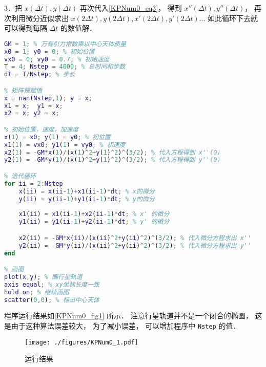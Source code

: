 3．把 $x(\Delta t), y(\Delta t)$ 再次代入\autoref{KPNum0_eq3}， 得到 $x''(\Delta t), y''(\Delta t)$， 再次利用微分近似求出 $x(2\Delta t), y(2\Delta t), x'(2\Delta t), y'(2\Delta t) \dots$ 如此循环下去就可以得到每隔 $\Delta t$ 的数值解．

\begin{lstlisting}[language=matlab, caption=kepler.m]
% 参数设定
GM = 1; % 万有引力常数乘以中心天体质量
x0 = 1; y0 = 0; % 初始位置
vx0 = 0; vy0 = 0.7; % 初始速度
T = 4; Nstep = 4000; % 总时间和步数
dt = T/Nstep; % 步长

% 矩阵预赋值
x = nan(Nstep,1); y = x;
x1 = x;  y1 = x;
x2 = x; y2 = x;

% 初始位置，速度，加速度
x(1) = x0; y(1) = y0; % 初位置
x1(1) = vx0; y1(1) = vy0; % 初速度
x2(1) = -GM*x(1)/(x(1)^2+y(1)^2)^(3/2); % 代入方程得到 x''(0)
y2(1) = -GM*y(1)/(x(1)^2+y(1)^2)^(3/2); % 代入方程得到 y''(0)

% 迭代循环
for ii = 2:Nstep
    x(ii) = x(ii-1)+x1(ii-1)*dt; % x的微分
    y(ii) = y(ii-1)+y1(ii-1)*dt; % y的微分
    
    x1(ii) = x1(ii-1)+x2(ii-1)*dt; % x' 的微分
    y1(ii) = y1(ii-1)+y2(ii-1)*dt; % y' 的微分

    x2(ii) = -GM*x(ii)/(x(ii)^2+y(ii)^2)^(3/2); % 代入微分方程求出 x''
    y2(ii) = -GM*y(ii)/(x(ii)^2+y(ii)^2)^(3/2); % 代入微分方程求出 y''
end

% 画图
plot(x,y); % 画行星轨道
axis equal; % xy坐标长度一致
hold on; % 继续画图
scatter(0,0); % 标出中心天体
\end{lstlisting}

程序运行结果如\autoref{KPNum0_fig1} 所示． 注意行星轨道并不是一个闭合的椭圆， 这是由于这种算法误差较大， 为了减小误差， 可以增加程序中 \verb|Nstep| 的值．
\begin{figure}[ht]
\centering
\texttt{[image: ./figures/KPNum0\_1.pdf]}
\caption{运行结果} \label{KPNum0_fig1}
\end{figure}

